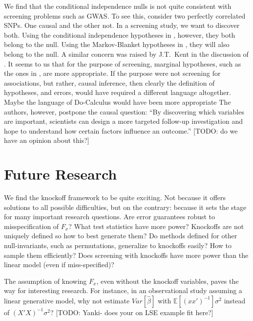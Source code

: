 \documentclass[article,lineno]{biometrika}
\begin{document}
We find that the conditional independence nulls is not quite consistent with screening problems such as GWAS.
To see this, consider two perfectly correlated SNPs.
One causal and the other not.
In a screening study, we want to discover both. 
Using the conditional independence hypotheses in \cite{SesiaGenehuntinghidden}, however, they both belong to the null.
Using the Markov-Blanket hypotheses in \cite{CandesPanninggoldmodelX2018}, they will also belong to the null.
A similar concern was raised by J.T.\ Kent in the discussion of \cite{MeinshausenStabilityselection2010}.
It seems to us that for the purpose of screening, marginal hypotheses, such as the ones in \cite{TusherSignificanceanalysismicroarrays2001}, are more appropriate.
If the purpose were not screening for associations, but rather, causal inference, then clearly the definition of hypotheses, and errors, would have required a different language altogether. 
Maybe the language of Do-Calculus \citep{pearl1995causal} would have been more appropriate 
The authors, however, postpone the causal question: 
``By discovering which variables are important, scientists can design a more targeted follow-up investigation and hope to understand how certain factors influence an outcome.''
[TODO: do we have an opinion about this?]






\section{Future Research}

We find the knockoff framework to be quite exciting.
Not because it offers solutions to all possible difficulties, but on the contrary: because it sets the stage for many important research questions.
Are error guarantees robust to misspecification of $F_x$?
What test statistics have more power?
Knockoffs are not uniquely defined so how to best generate them?
Do methods defined for other null-invariants, such as permutations, generalize to knockoffs easily?
How to sample them efficiently?
Does screening with knockoffs have more power than the linear model (even if miss-specified)?

The assumption of knowing $F_x$, even without the knockoff variables, paves the way for interesting research. 
For instance, in an observational study assuming a linear generative model, why not estimate $Var[\hat{\beta}]$ with $\mathbb{E}[(xx')^{-1}]\sigma^2$ instead of $(X'X)^{-1}\sigma^2$?
[TODO: Yanki- does your on LSE example fit here?]
\end{document}

